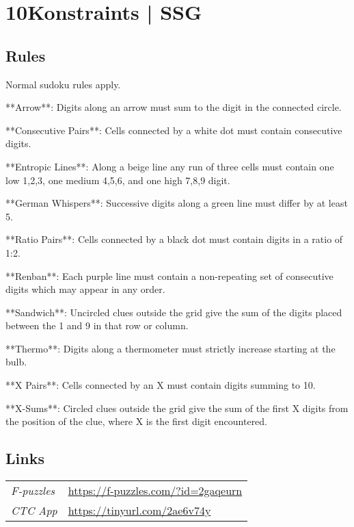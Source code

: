 \section[10Konstraints | SSG {[\emph{Multi-Variant Sudoku}]}]{10Konstraints | {\normalfont SSG}}
\label{sec:35-10konstraints-ssg}

\subsection*{Rules}
\begin{markdown}
Normal sudoku rules apply.



**Arrow**: Digits along an arrow must sum to the digit in the connected circle.



**Consecutive Pairs**: Cells connected by a white dot must contain consecutive digits.



**Entropic Lines**: Along a beige line any run of three cells must contain one low {1,2,3}, one medium {4,5,6}, and one high {7,8,9} digit.



**German Whispers**: Successive digits along a green line must differ by at least 5.



**Ratio Pairs**: Cells connected by a black dot must contain digits in a ratio of 1:2.



**Renban**: Each purple line must contain a non-repeating set of consecutive digits which may appear in any order.



**Sandwich**: Uncircled clues outside the grid give the sum of the digits placed between the 1 and 9 in that row or column.



**Thermo**: Digits along a thermometer must strictly increase starting at the bulb.



**X Pairs**: Cells connected by an X must contain digits summing to 10.



**X-Sums**: Circled clues outside the grid give the sum of the first X digits from the position of the clue, where X is the first digit encountered.
\end{markdown}
\subsection*{Links}
\begin{tabularx}{\textwidth}{l X}
\emph{F-puzzles} & \url{https://f-puzzles.com/?id=2gaqeurn} \\
\emph{CTC App} & \url{https://tinyurl.com/2ae6v74y} \\
\end{tabularx}
\pagebreak
